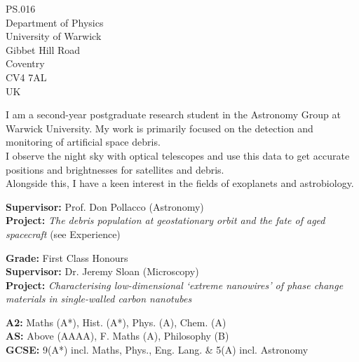 
\begin{flushright}
\vspace{-1em}
\small PS.016 \\
Department of Physics \\
University of Warwick \\
Gibbet Hill Road \\
Coventry \\
CV4 7AL \\
UK
\end{flushright}

\medskip

\vspace{-1em}
\small \justify I am a second-year postgraduate research student in the Astronomy Group at Warwick University.
My work is primarily focused on the detection and monitoring of artificial space debris. \\
I observe the night sky with optical telescopes and use this data to get accurate positions and brightnesses for satellites and debris. \\
Alongside this, I have a keen interest in the fields of exoplanets and astrobiology.

\medskip


\vspace{-1em}
\small \justify \textbf{Supervisor:} Prof. Don Pollacco (Astronomy) \\
\textbf{Project:} \textit{The debris population at geostationary orbit and the fate of aged spacecraft} (see Experience)

\divider

\small \textbf{Grade:} First Class Honours \\
\textbf{Supervisor:} Dr. Jeremy Sloan (Microscopy) \\
\textbf{Project:} \textit{Characterising low-dimensional `extreme nanowires' of phase change materials in single-walled carbon nanotubes}

\divider

\small \textbf{A2:} Maths (A*), Hist. (A*), Phys. (A), Chem. (A) \\
\textbf{AS:} Above (AAAA), F. Maths (A), Philosophy (B) \\
\textbf{GCSE:} 9(A*) incl. Maths, Phys., Eng. Lang. \& 5(A) incl. Astronomy
